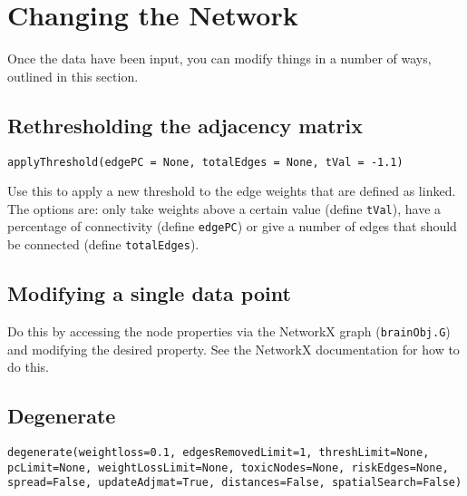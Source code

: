 \documentclass{report}
\begin{document}

\section{Changing the Network}
Once the data have been input, you can modify things in a number of ways, outlined in this section.

\subsection{Rethresholding the adjacency matrix}

\noindent \texttt{applyThreshold(edgePC = None, totalEdges = None, tVal = -1.1)}

\vspace{12pt}

Use this to apply a new threshold to the edge weights that are defined as linked. The options are: only take weights above a certain value (define \texttt{tVal}), have a percentage of connectivity (define \texttt{edgePC}) or give a number of edges that should be connected (define \texttt{totalEdges}). 

\subsection{Modifying a single data point}

Do this by accessing the node properties via the NetworkX graph (\texttt{brainObj.G}) and modifying the desired property. See the NetworkX documentation for how to do this.

\subsection{Degenerate}

\noindent \texttt{degenerate(weightloss=0.1, edgesRemovedLimit=1, threshLimit=None,
                   pcLimit=None, weightLossLimit=None, toxicNodes=None,
                   riskEdges=None, spread=False, updateAdjmat=True,
                   distances=False, spatialSearch=False)}

\vspace{12pt}
\end{document}
